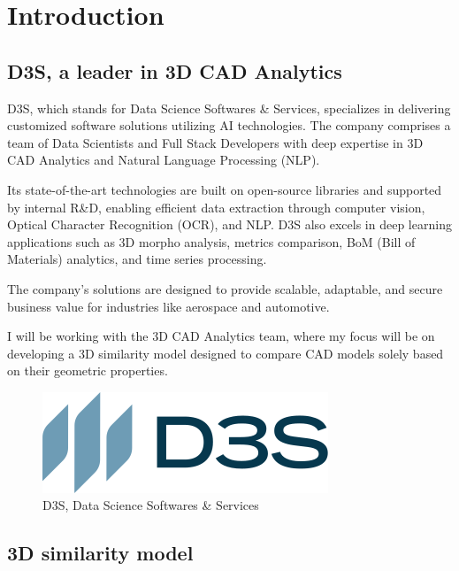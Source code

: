 \chapter{Introduction}
\label{chap:introduction}


\section{D3S, a leader in 3D CAD Analytics}

D3S, which stands for Data Science Softwares \& Services, specializes in delivering customized software solutions utilizing AI technologies. The company comprises a team of Data Scientists and Full Stack Developers with deep expertise in 3D CAD Analytics and Natural Language Processing (NLP).  

Its state-of-the-art technologies are built on open-source libraries and supported by internal R\&D, enabling efficient data extraction through computer vision, Optical Character Recognition (OCR), and NLP. D3S also excels in deep learning applications such as 3D morpho analysis, metrics comparison, BoM (Bill of Materials) analytics, and time series processing. 

The company’s solutions are designed to provide scalable, adaptable, and secure business value for industries like aerospace and automotive.

\vspace{1cm}

I will be working with the 3D CAD Analytics team, where my focus will be on developing a 3D similarity model designed to compare CAD models solely based on their geometric properties.

\begin{figure}[]
    \centering
    \includegraphics[width=0.3\columnwidth]{images/d3s_logo.png}
    \caption{D3S, Data Science Softwares \& Services}
    \label{fig:d3s_logo}
\end{figure}

\section{3D similarity model}